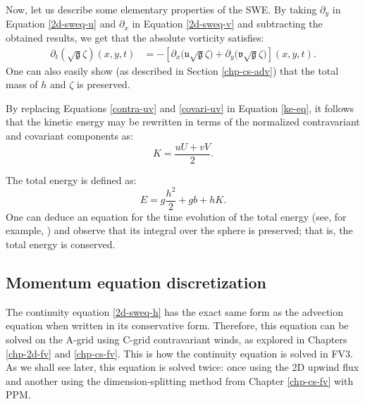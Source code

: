 Now, let us describe some elementary properties of the SWE.
By taking $\partial_y$ in Equation \eqref{2d-sweq-u} and $\partial_x$ in Equation \eqref{2d-sweq-v} and
subtracting the obtained results, we get that the absolute vorticity satisfies:
\begin{align}
	\label{absvort-eq}
	{\partial_t (\sqrt{\mathfrak{g}} {\zeta})}(x,y,t) & = 
	-[{\partial_x (\mathfrak{u}\sqrt{\mathfrak{g}}{\zeta}})
	+ {\partial_y (\mathfrak{v}\sqrt{\mathfrak{g}}{\zeta}})](x,y,t).
\end{align}
One can also easily show (as described in Section \ref{chp-cs-adv}) that the total mass of $h$ and $\zeta$ is preserved.

By replacing Equations \eqref{contra-uv} and \eqref{covari-uv} in Equation \eqref{ke-eq}, 
it follows that the kinetic energy may be rewritten in terms of the normalized contravariant and covariant components as:
\begin{equation}
	\label{ke-eq2}
	K = \frac{{u}{U}+{v}{V}}{2}.
\end{equation}

The total energy is defined as:
\begin{equation}
	\label{energy}
	E = g\frac{h^2}{2} + gb + hK.
\end{equation}
One can deduce an equation for the time evolution of the total energy (see, for example, \citet{ringler:2010}) 
and observe that its integral over the sphere is preserved; that is, the total energy is conserved.

\subsection{Momentum equation discretization}
The continuity equation \eqref{2d-sweq-h} has the exact same form as the advection equation when written in its conservative form.
Therefore, this equation can be solved on the A-grid using C-grid contravariant winds, as explored in Chapters \ref{chp-2d-fv} and \ref{chp-cs-fv}.
This is how the continuity equation is solved in FV3.
As we shall see later, this equation is solved twice: 
once using the 2D upwind flux and another using the dimension-splitting method from Chapter \ref{chp-cs-fv} with PPM.

